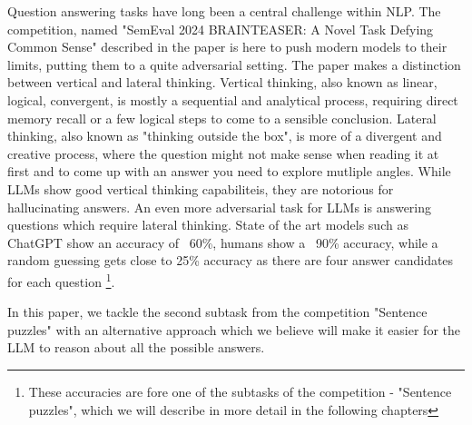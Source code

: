 Question answering tasks have long been a central challenge within NLP.  The competition, named 
"SemEval 2024 BRAINTEASER: A Novel Task Defying Common Sense" described in the paper \cite{semeval} is here to push modern models to their limits, putting
them to a quite adversarial setting.  The paper makes a distinction between vertical and lateral
thinking.  Vertical thinking, also known as linear, logical, convergent, is mostly a sequential and 
analytical process, requiring direct memory recall or a few logical steps to come to a sensible 
conclusion. Lateral thinking, also known as "thinking outside the box", is more of a divergent
and creative process, where the question might not make sense when reading it at first and to come
up with an answer you need to explore mutliple angles.  While LLMs show good vertical thinking 
capabiliteis, they are notorious for hallucinating answers. An even more adversarial task for
LLMs is answering questions which require lateral thinking.  State of the art models such as 
ChatGPT show an accuracy of ~60\%, humans show a ~90\% accuracy, while a random 
guessing gets close to 25\% accuracy as there are four answer candidates for each question
\footnote[1]{These accuracies are
fore one of the subtasks of the competition - "Sentence puzzles", which we will describe in more
detail in the following chapters}.

In this paper, we tackle the second subtask from the competition "Sentence puzzles" with an
alternative approach which we believe will make it easier for the LLM to reason about all the
possible answers.

